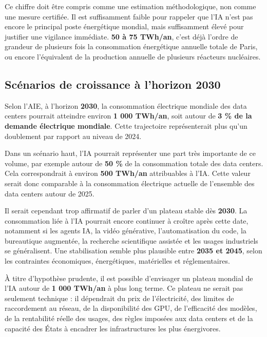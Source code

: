 \documentclass[
  10pt,
  a4paper,
  DIV=11,
  numbers=noendperiod,
  oneside]{scrreprt}
\let\oldtextbf\textbf
\renewcommand{\textbf}[1]{\oldtextbf{\textcolor{cmmnavy}{#1}}}
\begin{document}
Ce chiffre doit être compris comme une estimation méthodologique, non
comme une mesure certifiée. Il est suffisamment faible pour rappeler que
l'IA n'est pas encore le principal poste énergétique mondial, mais
suffisamment élevé pour justifier une vigilance immédiate. \textbf{50 à
75 TWh/an}, c'est déjà l'ordre de grandeur de plusieurs fois la
consommation énergétique annuelle totale de Paris, ou encore
l'équivalent de la production annuelle de plusieurs réacteurs
nucléaires.

\subsection{Scénarios de croissance à l'horizon
2030}\label{scuxe9narios-de-croissance-uxe0-lhorizon-2030}

Selon l'AIE, à l'horizon \textbf{2030}, la consommation électrique
mondiale des data centers pourrait atteindre environ \textbf{1 000
TWh/an}, soit autour de \textbf{3 \% de la demande électrique mondiale}.
Cette trajectoire représenterait plus qu'un doublement par rapport au
niveau de 2024.

Dans un scénario haut, l'IA pourrait représenter une part très
importante de ce volume, par exemple autour de \textbf{50 \%} de la
consommation totale des data centers. Cela correspondrait à environ
\textbf{500 TWh/an} attribuables à l'IA. Cette valeur serait donc
comparable à la consommation électrique actuelle de l'ensemble des data
centers autour de 2025.

Il serait cependant trop affirmatif de parler d'un plateau stable dès
\textbf{2030}. La consommation liée à l'IA pourrait encore continuer à
croître après cette date, notamment si les agents IA, la vidéo
générative, l'automatisation du code, la bureautique augmentée, la
recherche scientifique assistée et les usages industriels se
généralisent. Une stabilisation semble plus plausible entre \textbf{2035
et 2045}, selon les contraintes économiques, énergétiques, matérielles
et réglementaires.

À titre d'hypothèse prudente, il est possible d'envisager un plateau
mondial de l'IA autour de \textbf{1 000 TWh/an} à plus long terme. Ce
plateau ne serait pas seulement technique : il dépendrait du prix de
l'électricité, des limites de raccordement au réseau, de la
disponibilité des GPU, de l'efficacité des modèles, de la rentabilité
réelle des usages, des règles imposées aux data centers et de la
capacité des États à encadrer les infrastructures les plus énergivores.
\end{document}
